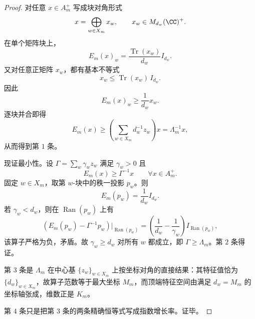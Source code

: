 \begin{proof}
对任意 \(x\in A_m^+\) 写成块对角形式
\[
x=\bigoplus_{w\in X_m}x_w,
\qquad
x_w\in M_{d_w}(\CC)^+.
\]
在单个矩阵块上，
\[
E_m(x)_w=\frac{\operatorname{Tr}(x_w)}{d_w}I_{d_w}.
\]
又对任意正矩阵 \(x_w\)，都有基本不等式
\[
x_w\le \operatorname{Tr}(x_w)\,I_{d_w}.
\]
因此
\[
E_m(x)_w\ge \frac{1}{d_w}x_w.
\]
逐块并合即得
\[
E_m(x)\ge \left(\sum_{w\in X_m}d_w^{-1}z_w\right)x=\Lambda_m^{-1}x,
\]
从而得到第 \(1\) 条。

现证最小性。设 \(\Gamma=\sum_w\gamma_w z_w\) 满足 \(\gamma_w>0\) 且
\[
E_m(x)\ge \Gamma^{-1}x
\qquad
\forall x\in A_m^+.
\]
固定 \(w\in X_m\)，取第 \(w\)-块中的秩一投影 \(p_w\)。则
\[
E_m(p_w)=\frac{1}{d_w}I_{d_w}.
\]
若 \(\gamma_w<d_w\)，则在 \(\operatorname{Ran}(p_w)\) 上有
\[
\left(E_m(p_w)-\Gamma^{-1}p_w\right)\big|_{\operatorname{Ran}(p_w)}
=
\left(\frac{1}{d_w}-\frac{1}{\gamma_w}\right)I_{\operatorname{Ran}(p_w)},
\]
该算子严格为负，矛盾。故 \(\gamma_w\ge d_w\) 对所有 \(w\) 都成立，即
\(\Gamma\ge \Lambda_m\)。第 \(2\) 条得证。

第 \(3\) 条是 \(\Lambda_m\) 在中心基 \(\{z_w\}_{w\in X_m}\) 上按坐标对角的直接结果：其特征值恰为 \(\{d_w\}_{w\in X_m}\)，故算子范数等于最大坐标 \(M_m\)，而顶端特征空间由满足 \(d_w=M_m\) 的坐标轴张成，维数正是 \(K_m\)。

第 \(4\) 条只是把第 \(3\) 条的两条精确恒等式写成指数增长率。证毕。
\end{proof}

